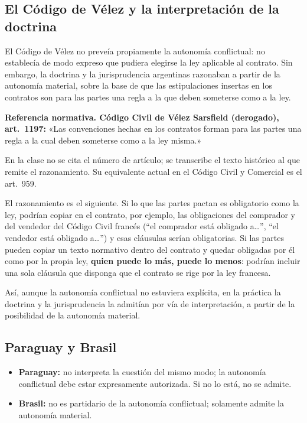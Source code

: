 \documentclass[12pt,oneside]{book}
\begin{document}
\subsection{El Código de Vélez y la interpretación de la doctrina}

El Código de Vélez no preveía propiamente la autonomía conflictual: no establecía de modo expreso que pudiera elegirse la ley aplicable al contrato. Sin embargo, la doctrina y la jurisprudencia argentinas razonaban a partir de la autonomía material, sobre la base de que las estipulaciones insertas en los contratos son para las partes una regla a la que deben someterse como a la ley.

\begin{note}
\textbf{Referencia normativa. Código Civil de Vélez Sarsfield (derogado), art.\ 1197:} «Las convenciones hechas en los contratos forman para las partes una regla a la cual deben someterse como a la ley misma.»

En la clase no se cita el número de artículo; se transcribe el texto histórico al que remite el razonamiento. Su equivalente actual en el Código Civil y Comercial es el art.\ 959.
\end{note}

El razonamiento es el siguiente. Si lo que las partes pactan es obligatorio como la ley, podrían copiar en el contrato, por ejemplo, las obligaciones del comprador y del vendedor del Código Civil francés (``el comprador está obligado a\ldots'', ``el vendedor está obligado a\ldots'') y esas cláusulas serían obligatorias. Si las partes pueden copiar un texto normativo dentro del contrato y quedar obligadas por él como por la propia ley, \textbf{quien puede lo más, puede lo menos}: podrían incluir una sola cláusula que disponga que el contrato se rige por la ley francesa.

Así, aunque la autonomía conflictual no estuviera explícita, en la práctica la doctrina y la jurisprudencia la admitían por vía de interpretación, a partir de la posibilidad de la autonomía material.

\subsection{Paraguay y Brasil}

\begin{itemize}
    \item \textbf{Paraguay:} no interpreta la cuestión del mismo modo; la autonomía conflictual debe estar expresamente autorizada. Si no lo está, no se admite.
    \item \textbf{Brasil:} no es partidario de la autonomía conflictual; solamente admite la autonomía material.
\end{itemize}
\end{document}
